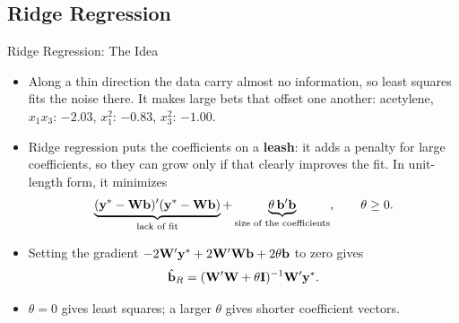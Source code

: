\subsection{Ridge Regression}


\begin{frame}{Ridge Regression: The Idea}
    \begin{itemize}
        \item Along a thin direction the data carry almost no information, so least squares fits the noise there. It makes large bets that offset one another: acetylene, $x_1x_3$: $-2.03$, $x_1^2$: $-0.83$, $x_3^2$: $-1.00$.
        \item Ridge regression puts the coefficients on a \textbf{leash}: it adds a penalty for large coefficients, so they can grow only if that clearly improves the fit. In unit-length form, it minimizes
        \[
        \underbrace{(\mathbf{y}^*-\mathbf{W}\mathbf{b})'(\mathbf{y}^*-\mathbf{W}\mathbf{b})}_{\text{lack of fit}}+\underbrace{\theta\,\mathbf{b}'\mathbf{b}}_{\text{size of the coefficients}},\qquad\theta\ge0 .
        \]
        \item Setting the gradient $-2\mathbf{W}'\mathbf{y}^*+2\mathbf{W}'\mathbf{W}\mathbf{b}+2\theta\mathbf{b}$ to zero gives
        \[
        \hat{\mathbf{b}}_R=(\mathbf{W}'\mathbf{W}+\theta\mathbf{I})^{-1}\mathbf{W}'\mathbf{y}^* .
        \]
        \item $\theta=0$ gives least squares; a larger $\theta$ gives shorter coefficient vectors.
    \end{itemize}
\end{frame}






